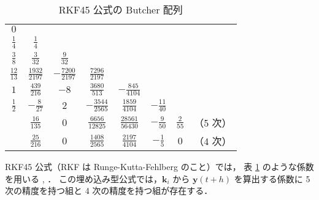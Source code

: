 \begin{table}[tb]
    \caption{RKF45 公式の Butcher 配列}
    \label{table:ode_runge-kutta_butcher-array-rkf45}
    \centering
    \begin{tabular}{c|ccccccc}
        $0$             &                     &                      &                      &                       &                  &                &          \\
        $\frac{1}{4}$   & $\frac{1}{4}$       &                      &                      &                       &                  &                &          \\
        $\frac{3}{8}$   & $\frac{3}{32}$      & $\frac{9}{32}$       &                      &                       &                  &                &          \\
        $\frac{12}{13}$ & $\frac{1932}{2197}$ & $-\frac{7200}{2197}$ & $\frac{7296}{2197}$  &                       &                  &                &          \\
        $1$             & $\frac{439}{216}$   & $-8$                 & $\frac{3680}{513}$   & $-\frac{845}{4104}$   &                  &                &          \\
        $\frac{1}{2}$   & $-\frac{8}{27}$     & $2$                  & $-\frac{3544}{2565}$ & $\frac{1859}{4104}$   & $-\frac{11}{40}$ &                &          \\
        \hline
                        & $\frac{16}{135}$    & $0$                  & $\frac{6656}{12825}$ & $\frac{28561}{56430}$ & $-\frac{9}{50}$  & $\frac{2}{55}$ & （5 次） \\
                        & $\frac{25}{216}$    & $0$                  & $\frac{1408}{2565}$  & $\frac{2197}{4104}$   & $-\frac{1}{5}$   & $0$            & （4 次）
    \end{tabular}
\end{table}

RKF45 公式（RKF は Runge-Kutta-Fehlberg のこと）では，
表 \ref{table:ode_runge-kutta_butcher-array-rkf45} のような係数を用いる
\cite[4.1 節 (a)]{Mitsui1993}, \cite[Section 9.5]{Mathews2004}．
この埋め込み型公式では，$\bm{k}_i$ から $\bm{y}(t + h)$ を算出する係数に
5 次の精度を持つ組と 4 次の精度を持つ組が存在する．
